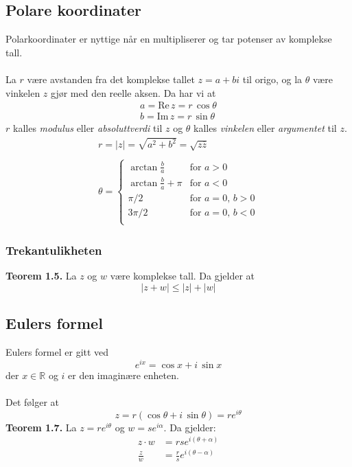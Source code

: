 \documentclass{article}
\begin{document}
\subsection{Polare koordinater}
Polarkoordinater er nyttige når en multipliserer og tar potenser av komplekse tall.
\\\\
La $r$ være avstanden fra det komplekse tallet $z =
a + bi$ til origo, og la $\theta$ være vinkelen $z$ gjør med den reelle aksen. Da har vi at
\begin{gather*}
    a = \text{Re}\, z = r \, \cos{\theta} \\
    b = \text{Im}\, z = r \, \sin{\theta}
\end{gather*}
$r$ kalles \textit{modulus} eller \textit{absoluttverdi} til $z$ og $\theta$ kalles \textit{vinkelen} eller \textit{argumentet} til $z$.
\begin{gather*}
    r = |z| = \sqrt{a^2 + b^2} = \sqrt{z\overline{z}} \\\\
    \theta =
    \begin{cases}
        \arctan \frac{b}{a} & \text{for } a > 0 \\
        \arctan \frac{b}{a} + \pi & \text{for } a < 0 \\
        \pi / 2 & \text{for } a = 0, \, b > 0 \\
        3\pi / 2 & \text{for } a = 0, \, b < 0 \\
    \end{cases}
\end{gather*}


\subsubsection{Trekantulikheten}
\textbf{Teorem 1.5.} La $z$ og $w$ være komplekse tall. Da gjelder at
\[ |z + w| \leq |z| + |w| \]


\subsection{Eulers formel}
Eulers formel er gitt ved
\[ e^{ix} = \cos{x} + i \, \sin{x} \]
der $x \in \mathbb{R}$ og $i$ er den imaginære enheten.
\\\\
Det følger at
\[ z = r(\cos{\theta} + i \, \sin{\theta}) = re^{i\theta} \]
\textbf{Teorem 1.7.} La $z = re^{i\theta}$ og $w = se^{i\alpha}$. Da gjelder:
\begin{align*}
    z \cdot w &= rse^{i(\theta + \alpha)} \\
    \frac{z}{w} &= \frac{r}{s} e^{i(\theta - \alpha)}
\end{align*}
\end{document}
